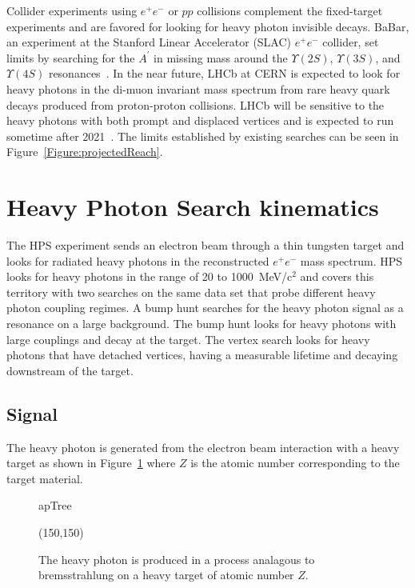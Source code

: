 \indent Collider experiments using $e^+e^-$ or $pp$ collisions complement the fixed-target experiments and are favored for looking for heavy photon invisible decays.  BaBar, an experiment at the Stanford Linear Accelerator (SLAC) $e^+e^-$ collider, set limits by searching for the $A^{\prime}$ in missing mass around the $\Upsilon(2S)$, $\Upsilon(3S)$, and $\Upsilon(4S)$ resonances~\cite{Lees_2014xha}. In the near future, LHCb at CERN is expected to look for heavy photons in the di-muon invariant mass spectrum from rare heavy quark decays produced from proton-proton collisions. LHCb will be sensitive to the heavy photons with both prompt and displaced vertices and is expected to run sometime after 2021~\cite{Ilten_2016tkc}. The limits established by existing searches can be seen in Figure~\ref{Figure:projectedReach}.

\section{Heavy Photon Search kinematics}
The HPS experiment sends an electron beam through a thin tungsten target and looks for radiated heavy photons in the reconstructed $e^+e^-$ mass spectrum. HPS looks for heavy photons in the range of 20 to 1000~MeV/c$^2$ and covers this territory with two searches on the same data set that probe different heavy photon coupling regimes. A bump hunt searches for the heavy photon signal as a resonance on a large background. The bump hunt looks for heavy photons with large couplings and decay at the target. The vertex search looks for heavy photons that have detached vertices, having a measurable lifetime and decaying downstream of the target. 

\subsection{Signal}

The heavy photon is generated from the electron beam interaction with a heavy target as shown in Figure~\ref{fig:apTree} where $Z$ is the atomic number corresponding to the target material.  

\begin{figure}[htb]
    \begin{center}
	\begin{fmffile}{apTree}
	\begin{fmfgraph*}(150,150)
	\fmfstraight
		\fmffreeze
		\fmffreeze	
	\end{fmfgraph*}
	\end{fmffile}
  	\end{center}
    	\caption[Heavy photon production in a fixed-target experiment]{The heavy photon is produced in a process analagous to bremsstrahlung on a heavy target of atomic number $Z$.}
   	 \label{fig:apTree}	
\end{figure}


